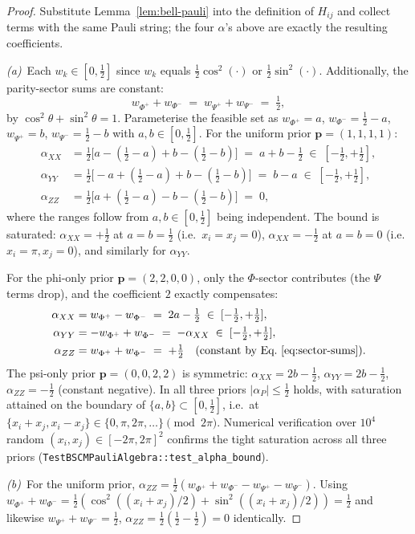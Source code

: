 \documentclass[pdflatex,sn-mathphys]{sn-jnl}
\theoremstyle{plain}
\theoremstyle{remark}
\theoremstyle{definition}
\begin{document}
\begin{proof}
Substitute Lemma~\ref{lem:bell-pauli} into the definition of $H_{ij}$ and collect terms with the same Pauli string; the four $\alpha$'s above are exactly the resulting coefficients.

\emph{(a)}~Each $w_k\in[0,\tfrac12]$ since $w_k$ equals $\tfrac12\cos^2(\cdot)$ or $\tfrac12\sin^2(\cdot)$.  Additionally, the parity-sector sums are constant:
\begin{equation}\label{eq:sector-sums}
w_{\Phi^+}+w_{\Phi^-} \;=\; w_{\Psi^+}+w_{\Psi^-} \;=\; \tfrac12,
\end{equation}
by $\cos^2\theta + \sin^2\theta = 1$.  Parameterise the feasible set as
$w_{\Phi^+}=a$, $w_{\Phi^-}=\tfrac12-a$, $w_{\Psi^+}=b$, $w_{\Psi^-}=\tfrac12-b$
with $a, b \in [0, \tfrac12]$.  For the uniform prior $\boldsymbol{p}=(1,1,1,1)$:
\begin{align*}
\alpha_{XX} &= \tfrac12\bigl[a - (\tfrac12-a) + b - (\tfrac12-b)\bigr] \;=\; a + b - \tfrac12 \;\in\; [-\tfrac12, +\tfrac12], \\
\alpha_{YY} &= \tfrac12\bigl[-a + (\tfrac12-a) + b - (\tfrac12-b)\bigr] \;=\; b - a \;\in\; [-\tfrac12, +\tfrac12], \\
\alpha_{ZZ} &= \tfrac12\bigl[a + (\tfrac12-a) - b - (\tfrac12-b)\bigr] \;=\; 0,
\end{align*}
where the ranges follow from $a, b \in [0, \tfrac12]$ being independent.  The bound is saturated: $\alpha_{XX} = +\tfrac12$ at $a=b=\tfrac12$ (i.e.\ $x_i=x_j=0$), $\alpha_{XX} = -\tfrac12$ at $a=b=0$ (i.e.\ $x_i=\pi, x_j=0$), and similarly for $\alpha_{YY}$.

For the phi-only prior $\boldsymbol{p}=(2,2,0,0)$, only the $\Phi$-sector contributes (the $\Psi$ terms drop), and the coefficient $2$ exactly compensates:
\begin{align*}
\alpha_{XX} &= w_{\Phi^+} - w_{\Phi^-} \;=\; 2a - \tfrac12 \;\in\; [-\tfrac12, +\tfrac12], \\
\alpha_{YY} &= -w_{\Phi^+} + w_{\Phi^-} \;=\; -\alpha_{XX} \;\in\; [-\tfrac12, +\tfrac12], \\
\alpha_{ZZ} &= w_{\Phi^+} + w_{\Phi^-} \;=\; +\tfrac12 \quad\text{(constant by Eq.~\ref{eq:sector-sums})}.
\end{align*}
The psi-only prior $\boldsymbol{p}=(0,0,2,2)$ is symmetric: $\alpha_{XX}=2b-\tfrac12$, $\alpha_{YY}=2b-\tfrac12$, $\alpha_{ZZ}=-\tfrac12$ (constant negative).  In all three priors $|\alpha_P|\le \tfrac12$ holds, with saturation attained on the boundary of $\{a, b\} \subset [0, \tfrac12]$, i.e.\ at $\{x_i+x_j, x_i-x_j\} \in \{0, \pi, 2\pi, \ldots\} \pmod{2\pi}$.  Numerical verification over $10^{4}$ random $(x_i, x_j)\in[-2\pi,2\pi]^2$ confirms the tight saturation across all three priors (\texttt{TestBSCMPauliAlgebra::test\_alpha\_bound}).

\emph{(b)}~For the uniform prior, $\alpha_{ZZ}=\tfrac12 (w_{\Phi^+}+w_{\Phi^-}-w_{\Psi^+}-w_{\Psi^-})$. Using $w_{\Phi^+}+w_{\Phi^-}=\tfrac12(\cos^2((x_i+x_j)/2)+\sin^2((x_i+x_j)/2))=\tfrac12$ and likewise $w_{\Psi^+}+w_{\Psi^-}=\tfrac12$, $\alpha_{ZZ} = \tfrac12(\tfrac12 - \tfrac12) = 0$ identically.
\end{proof}
\end{document}
